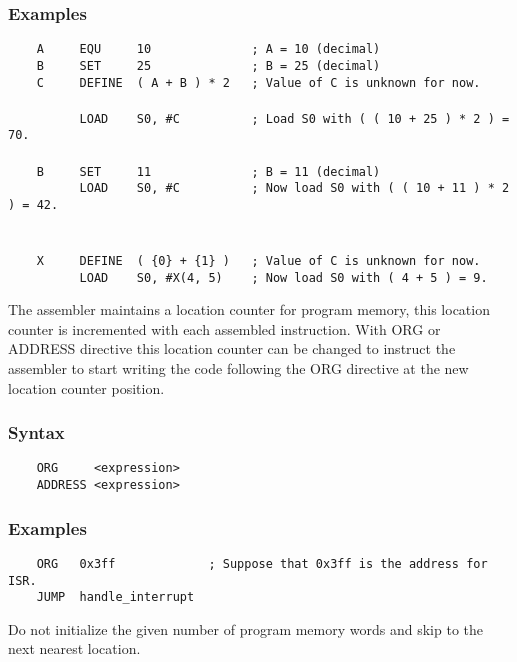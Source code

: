     \subsubsection{Examples}
        \verb'    A     EQU     10              ; A = 10 (decimal)'\\
        \verb'    B     SET     25              ; B = 25 (decimal)'\\
        \verb'    C     DEFINE  ( A + B ) * 2   ; Value of C is unknown for now.'\\
        \verb''\\
        \verb'          LOAD    S0, #C          ; Load S0 with ( ( 10 + 25 ) * 2 ) = 70.'\\
        \verb''\\
        \verb'    B     SET     11              ; B = 11 (decimal)'\\
        \verb'          LOAD    S0, #C          ; Now load S0 with ( ( 10 + 11 ) * 2 ) = 42.'\\
        \verb''\\
        \verb''\\
        \verb'    X     DEFINE  ( {0} + {1} )   ; Value of C is unknown for now.'\\
        \verb'          LOAD    S0, #X(4, 5)    ; Now load S0 with ( 4 + 5 ) = 9.'

    The assembler maintains a location counter for program memory, this location counter is incremented with each assembled instruction. With ORG or ADDRESS directive this location counter can be changed to instruct the assembler to start writing the code following the ORG directive at the new location counter position.

    \subsubsection{Syntax}
        \verb'    ORG     <expression>'\\
        \verb'    ADDRESS <expression>'


    \subsubsection{Examples}
        \verb'    ORG   0x3ff             ; Suppose that 0x3ff is the address for ISR.'\\
        \verb'    JUMP  handle_interrupt'

    Do not initialize the given number of program memory words and skip to the next nearest location.

